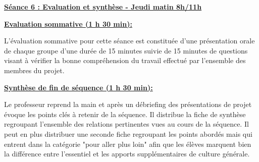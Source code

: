 \documentclass[12pt]{article}
\begin{document}
\vspace{20pt}

\color{red}
\textbf{\underline{Séance 6 : Evaluation et synthèse - Jeudi matin 8h/11h}}\par
\vspace{10pt}
\color{black}


\vspace{20pt}
\begin{adjustwidth}{6.5em}{0pt}
\color{blue}
\textbf{\underline{Evaluation sommative (1 h 30 min):}}\par
\vspace{10pt}
\color{black}
 
L'évaluation sommative pour cette séance est constituée d'une présentation orale de chaque groupe d'une durée de 15 minutes suivie de 15 minutes de questions visant à vérifier la bonne compréhension du travail effectué par l'ensemble des membres du projet. 
 \par

\vspace{20pt}
\color{blue}
\hspace{-20pt}\textbf{\underline{Synthèse de fin de séquence (1 h 30 min):}}\par
\vspace{10pt}
\color{black}
Le professeur reprend la main et après un débriefing des présentations de projet évoque les points clés à retenir de la séquence. Il distribue la fiche de synthèse regroupant l'ensemble des relations pertinentes vues au cours de la séquence. Il peut en plus distribuer une seconde fiche regroupant les points abordés mais qui entrent dans la catégorie "pour aller plus loin" afin que les élèves marquent bien la différence entre l'essentiel et les apports supplémentaires de culture générale.



 
\end{adjustwidth}


\vspace{20pt}
\renewcommand{\arraystretch}{1.8} 
\setlength{\tabcolsep}{1mm} 
\end{document}
